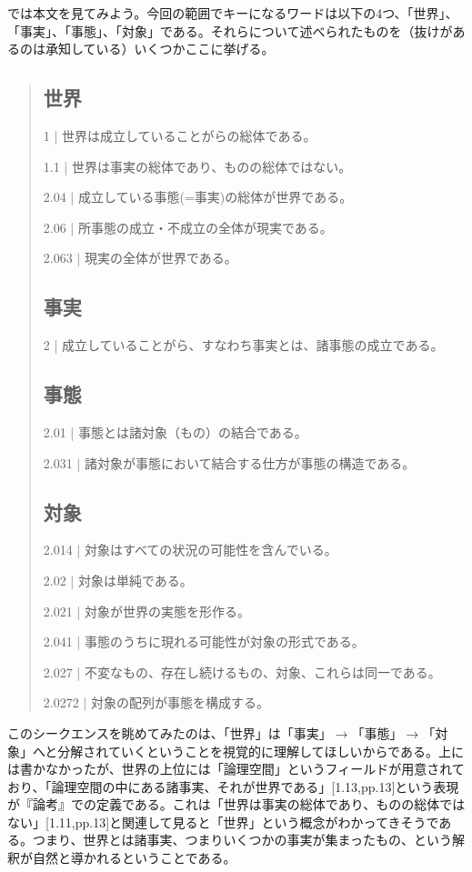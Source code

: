 \documentclass[a4paper,11pt]{jsarticle}
\begin{document}
では本文を見てみよう。今回の範囲でキーになるワードは以下の4つ、「世界」、「事実」、「事態」、「対象」である。それらについて述べられたものを（抜けがあるのは承知している）いくつかここに挙げる。

\begin{quote}
\subsection*{世界}
1 | 世界は成立していることがらの総体である。

1.1 | 世界は事実の総体であり、ものの総体ではない。

2.04 | 成立している事態(=事実)の総体が世界である。

2.06 | 所事態の成立・不成立の全体が現実である。

2.063 | 現実の全体が世界である。

\subsection*{事実}
2 | 成立していることがら、すなわち事実とは、諸事態の成立である。

\subsection*{事態}
2.01 | 事態とは諸対象（もの）の結合である。

2.031 | 諸対象が事態において結合する仕方が事態の構造である。
\subsection*{対象}
2.014 | 対象はすべての状況の可能性を含んでいる。

2.02 | 対象は単純である。

2.021 | 対象が世界の実態を形作る。

2.041 | 事態のうちに現れる可能性が対象の形式である。

2.027 | 不変なもの、存在し続けるもの、対象、これらは同一である。

2.0272 | 対象の配列が事態を構成する。
\end{quote}

このシークエンスを眺めてみたのは、「世界」は「事実」$\rightarrow$「事態」$\rightarrow$「対象」へと分解されていくということを視覚的に理解してほしいからである。上には書かなかったが、世界の上位には「論理空間」というフィールドが用意されており、「論理空間の中にある諸事実、それが世界である」[1.13,pp.13]という表現が『論考』での定義である。これは「世界は事実の総体であり、ものの総体ではない」[1.11,pp.13]と関連して見ると「世界」という概念がわかってきそうである。つまり、世界とは諸事実、つまりいくつかの事実が集まったもの、という解釈が自然と導かれるということである。
\end{document}

